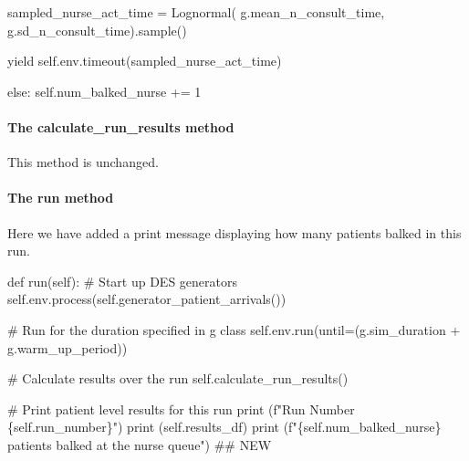 \documentclass[
  letterpaper,
  DIV=11,
  numbers=noendperiod]{scrreprt}
\let\oldparagraph\paragraph
\renewcommand{\paragraph}[1]{\oldparagraph{#1}\mbox{}}
\newenvironment{Shaded}{}{}
\newcommand{\BuiltInTok}[1]{\textcolor[rgb]{0.84,0.23,0.29}{#1}}
\newcommand{\CommentTok}[1]{\textcolor[rgb]{0.42,0.45,0.49}{#1}}
\newcommand{\ControlFlowTok}[1]{\textcolor[rgb]{0.84,0.23,0.29}{#1}}
\newcommand{\DecValTok}[1]{\textcolor[rgb]{0.00,0.36,0.77}{#1}}
\newcommand{\KeywordTok}[1]{\textcolor[rgb]{0.84,0.23,0.29}{#1}}
\newcommand{\NormalTok}[1]{\textcolor[rgb]{0.14,0.16,0.18}{#1}}
\newcommand{\OperatorTok}[1]{\textcolor[rgb]{0.14,0.16,0.18}{#1}}
\newcommand{\SpecialCharTok}[1]{\textcolor[rgb]{0.00,0.36,0.77}{#1}}
\newcommand{\SpecialStringTok}[1]{\textcolor[rgb]{0.01,0.18,0.38}{#1}}
\newcommand{\VariableTok}[1]{\textcolor[rgb]{0.89,0.38,0.04}{#1}}
\begin{document}
\begin{Shaded}
\begin{Highlighting}[]
\NormalTok{                sampled\_nurse\_act\_time }\OperatorTok{=}\NormalTok{ Lognormal(}
\NormalTok{                    g.mean\_n\_consult\_time, g.sd\_n\_consult\_time).sample()}

                \ControlFlowTok{yield} \VariableTok{self}\NormalTok{.env.timeout(sampled\_nurse\_act\_time)}

        \ControlFlowTok{else}\NormalTok{:}
            \VariableTok{self}\NormalTok{.num\_balked\_nurse }\OperatorTok{+=} \DecValTok{1}
\end{Highlighting}
\end{Shaded}

\paragraph{The calculate\_run\_results
method}\label{the-calculate_run_results-method-3}

This method is unchanged.

\paragraph{The run method}\label{the-run-method-5}

Here we have added a print message displaying how many patients balked
in this run.

\begin{Shaded}
\begin{Highlighting}[]
\KeywordTok{def}\NormalTok{ run(}\VariableTok{self}\NormalTok{):}
    \CommentTok{\# Start up DES generators}
    \VariableTok{self}\NormalTok{.env.process(}\VariableTok{self}\NormalTok{.generator\_patient\_arrivals())}

    \CommentTok{\# Run for the duration specified in g class}
    \VariableTok{self}\NormalTok{.env.run(until}\OperatorTok{=}\NormalTok{(g.sim\_duration }\OperatorTok{+}\NormalTok{ g.warm\_up\_period))}

    \CommentTok{\# Calculate results over the run}
    \VariableTok{self}\NormalTok{.calculate\_run\_results()}

    \CommentTok{\# Print patient level results for this run}
    \BuiltInTok{print}\NormalTok{ (}\SpecialStringTok{f"Run Number }\SpecialCharTok{\{}\VariableTok{self}\SpecialCharTok{.}\NormalTok{run\_number}\SpecialCharTok{\}}\SpecialStringTok{"}\NormalTok{)}
    \BuiltInTok{print}\NormalTok{ (}\VariableTok{self}\NormalTok{.results\_df)}
    \BuiltInTok{print}\NormalTok{ (}\SpecialStringTok{f"}\SpecialCharTok{\{}\VariableTok{self}\SpecialCharTok{.}\NormalTok{num\_balked\_nurse}\SpecialCharTok{\}}\SpecialStringTok{ patients balked at the nurse queue"}\NormalTok{) }\CommentTok{\#\# NEW}
\end{Highlighting}
\end{Shaded}
\end{document}
